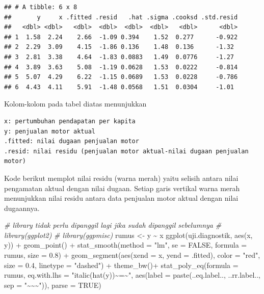 \documentclass[
]{book}
\newenvironment{Shaded}{\begin{snugshade}}{\end{snugshade}}
\newcommand{\AttributeTok}[1]{\textcolor[rgb]{0.77,0.63,0.00}{#1}}
\newcommand{\CommentTok}[1]{\textcolor[rgb]{0.56,0.35,0.01}{\textit{#1}}}
\newcommand{\ConstantTok}[1]{\textcolor[rgb]{0.00,0.00,0.00}{#1}}
\newcommand{\FloatTok}[1]{\textcolor[rgb]{0.00,0.00,0.81}{#1}}
\newcommand{\FunctionTok}[1]{\textcolor[rgb]{0.00,0.00,0.00}{#1}}
\newcommand{\NormalTok}[1]{#1}
\newcommand{\OtherTok}[1]{\textcolor[rgb]{0.56,0.35,0.01}{#1}}
\newcommand{\SpecialCharTok}[1]{\textcolor[rgb]{0.00,0.00,0.00}{#1}}
\newcommand{\StringTok}[1]{\textcolor[rgb]{0.31,0.60,0.02}{#1}}
\begin{document}
\begin{verbatim}
## # A tibble: 6 x 8
##       y     x .fitted .resid   .hat .sigma .cooksd .std.resid
##   <dbl> <dbl>   <dbl>  <dbl>  <dbl>  <dbl>   <dbl>      <dbl>
## 1  1.58  2.24    2.66  -1.09 0.394    1.52  0.277      -0.922
## 2  2.29  3.09    4.15  -1.86 0.136    1.48  0.136      -1.32 
## 3  2.81  3.38    4.64  -1.83 0.0883   1.49  0.0776     -1.27 
## 4  3.89  3.63    5.08  -1.19 0.0628   1.53  0.0222     -0.814
## 5  5.07  4.29    6.22  -1.15 0.0689   1.53  0.0228     -0.786
## 6  4.43  4.11    5.91  -1.48 0.0568   1.51  0.0304     -1.01
\end{verbatim}

Kolom-kolom pada tabel diatas menunjukkan

\begin{verbatim}
x: pertumbuhan pendapatan per kapita
y: penjualan motor aktual
.fitted: nilai dugaan penjualan motor
.resid: nilai residu (penjualan motor aktual-nilai dugaan penjualan motor)
\end{verbatim}

Kode berikut memplot nilai residu (warna merah) yaitu selisih antara nilai pengamatan aktual dengan nilai dugaan. Setiap garis vertikal warna merah menunjukkan nilai residu antara data penjualan motor aktual dengan nilai dugaannya.

\begin{Shaded}
\begin{Highlighting}[]
\CommentTok{\# library tidak perlu dipanggil lagi jika sudah dipanggil sebelumnya}
\CommentTok{\# library(ggplot2) }
\CommentTok{\# library(ggpmisc)}
\NormalTok{rumus }\OtherTok{\textless{}{-}}\NormalTok{ y }\SpecialCharTok{\textasciitilde{}}\NormalTok{ x}
\FunctionTok{ggplot}\NormalTok{(uji.diagnostik, }\FunctionTok{aes}\NormalTok{(x, y)) }\SpecialCharTok{+}
  \FunctionTok{geom\_point}\NormalTok{() }\SpecialCharTok{+}
  \FunctionTok{stat\_smooth}\NormalTok{(}\AttributeTok{method =} \StringTok{"lm"}\NormalTok{, }\AttributeTok{se =} \ConstantTok{FALSE}\NormalTok{, }\AttributeTok{formula =}\NormalTok{ rumus, }\AttributeTok{size =} \FloatTok{0.8}\NormalTok{) }\SpecialCharTok{+}
  \FunctionTok{geom\_segment}\NormalTok{(}\FunctionTok{aes}\NormalTok{(}\AttributeTok{xend =}\NormalTok{ x, }\AttributeTok{yend =}\NormalTok{ .fitted), }\AttributeTok{color =} \StringTok{"red"}\NormalTok{, }\AttributeTok{size =} \FloatTok{0.4}\NormalTok{, }\AttributeTok{linetype =} \StringTok{"dashed"}\NormalTok{) }\SpecialCharTok{+} 
  \FunctionTok{theme\_bw}\NormalTok{()}\SpecialCharTok{+}
   \FunctionTok{stat\_poly\_eq}\NormalTok{(}\AttributeTok{formula =}\NormalTok{ rumus,}
                \AttributeTok{eq.with.lhs =} \StringTok{"italic(hat(y))\textasciitilde{}\textasciigrave{}=\textasciigrave{}\textasciitilde{}"}\NormalTok{,}
                \FunctionTok{aes}\NormalTok{(}\AttributeTok{label =} \FunctionTok{paste}\NormalTok{(..eq.label.., ..rr.label.., }\AttributeTok{sep =} \StringTok{"\textasciitilde{}\textasciitilde{}\textasciitilde{}"}\NormalTok{)), }
                \AttributeTok{parse =} \ConstantTok{TRUE}\NormalTok{) }
\end{Highlighting}
\end{Shaded}
\end{document}
